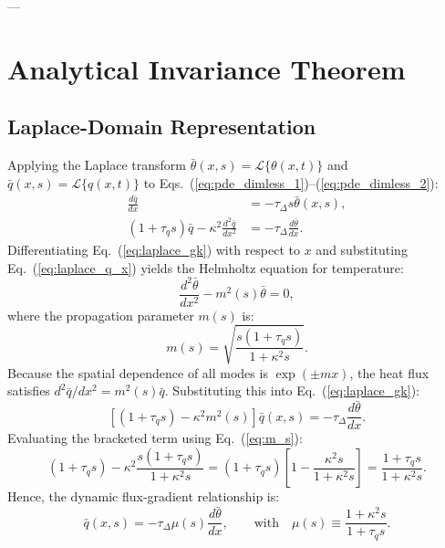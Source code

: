 \documentclass[review,12pt]{article}
\begin{document}
---

\section{Analytical Invariance Theorem}

\subsection{Laplace-Domain Representation}

Applying the Laplace transform $\bar{\theta}(x, s) = \mathcal{L}\{\theta(x, t)\}$ and $\bar{q}(x, s) = \mathcal{L}\{q(x, t)\}$ to Eqs.~(\ref{eq:pde_dimless_1})--(\ref{eq:pde_dimless_2}):
\begin{align}
\frac{d\bar{q}}{dx} &= -\tau_\Delta s \bar{\theta}(x, s), \label{eq:laplace_q_x} \\
(1 + \tau_q s)\bar{q} - \kappa^2 \frac{d^2\bar{q}}{dx^2} &= -\tau_\Delta \frac{d\bar{\theta}}{dx}. \label{eq:laplace_gk}
\end{align}
Differentiating Eq.~(\ref{eq:laplace_gk}) with respect to $x$ and substituting Eq.~(\ref{eq:laplace_q_x}) yields the Helmholtz equation for temperature:
\begin{equation}
\frac{d^2\bar{\theta}}{dx^2} - m^2(s)\bar{\theta} = 0,
\label{eq:helmholtz}
\end{equation}
where the propagation parameter $m(s)$ is:
\begin{equation}
m(s) = \sqrt{\frac{s(1 + \tau_q s)}{1 + \kappa^2 s}}.
\label{eq:m_s}
\end{equation}
Because the spatial dependence of all modes is $\exp(\pm m x)$, the heat flux satisfies $d^2\bar{q}/dx^2 = m^2(s)\bar{q}$. Substituting this into Eq.~(\ref{eq:laplace_gk}):
\begin{equation}
\left[(1 + \tau_q s) - \kappa^2 m^2(s)\right]\bar{q}(x, s) = -\tau_\Delta \frac{d\bar{\theta}}{dx}.
\end{equation}
Evaluating the bracketed term using Eq.~(\ref{eq:m_s}):
\begin{equation}
(1 + \tau_q s) - \kappa^2 \frac{s(1 + \tau_q s)}{1 + \kappa^2 s} = (1 + \tau_q s)\left[1 - \frac{\kappa^2 s}{1 + \kappa^2 s}\right] = \frac{1 + \tau_q s}{1 + \kappa^2 s}.
\end{equation}
Hence, the dynamic flux-gradient relationship is:
\begin{equation}
\bar{q}(x, s) = -\tau_\Delta \mu(s) \frac{d\bar{\theta}}{dx}, \qquad \text{with} \quad \mu(s) \equiv \frac{1 + \kappa^2 s}{1 + \tau_q s}.
\label{eq:dynamic_flux}
\end{equation}
\end{document}
